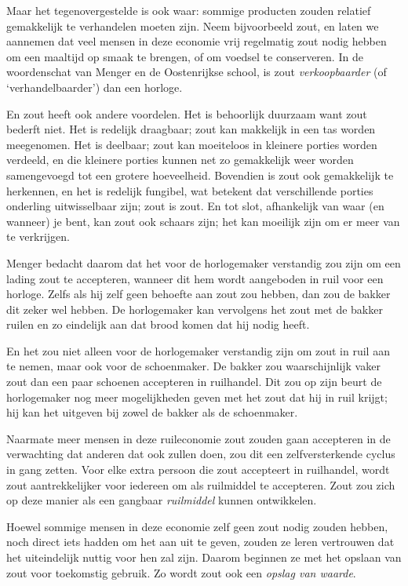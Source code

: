 \documentclass[
  a5paper,
  smalldemyvopaper,11pt,twoside,onecolumn,openright,extrafontsizes]{memoir}
\begin{document}
Maar het tegenovergestelde is ook waar: sommige producten zouden
relatief gemakkelijk te verhandelen moeten zijn. Neem bijvoorbeeld zout,
en laten we aannemen dat veel mensen in deze economie vrij regelmatig
zout nodig hebben om een maaltijd op smaak te brengen, of om voedsel te
conserveren. In de woordenschat van Menger en de Oostenrijkse school, is
zout \emph{verkoopbaarder} (of `verhandelbaarder') dan een horloge.

En zout heeft ook andere voordelen. Het is behoorlijk duurzaam want zout
bederft niet. Het is redelijk draagbaar; zout kan makkelijk in een tas
worden meegenomen. Het is deelbaar; zout kan moeiteloos in kleinere
porties worden verdeeld, en die kleinere porties kunnen net zo
gemakkelijk weer worden samengevoegd tot een grotere hoeveelheid.
Bovendien is zout ook gemakkelijk te herkennen, en het is redelijk
fungibel, wat betekent dat verschillende porties onderling uitwisselbaar
zijn; zout is zout. En tot slot, afhankelijk van waar (en wanneer) je
bent, kan zout ook schaars zijn; het kan moeilijk zijn om er meer van te
verkrijgen.

Menger bedacht daarom dat het voor de horlogemaker verstandig zou zijn
om een lading zout te accepteren, wanneer dit hem wordt aangeboden in
ruil voor een horloge. Zelfs als hij zelf geen behoefte aan zout zou
hebben, dan zou de bakker dit zeker wel hebben. De horlogemaker kan
vervolgens het zout met de bakker ruilen en zo eindelijk aan dat brood
komen dat hij nodig heeft.

En het zou niet alleen voor de horlogemaker verstandig zijn om zout in
ruil aan te nemen, maar ook voor de schoenmaker. De bakker zou
waarschijnlijk vaker zout dan een paar schoenen accepteren in
ruilhandel. Dit zou op zijn beurt de horlogemaker nog meer mogelijkheden
geven met het zout dat hij in ruil krijgt; hij kan het uitgeven bij
zowel de bakker als de schoenmaker.

Naarmate meer mensen in deze ruileconomie zout zouden gaan accepteren in
de verwachting dat anderen dat ook zullen doen, zou dit een
zelfversterkende cyclus in gang zetten. Voor elke extra persoon die zout
accepteert in ruilhandel, wordt zout aantrekkelijker voor iedereen om
als ruilmiddel te accepteren. Zout zou zich op deze manier als een
gangbaar \emph{ruilmiddel} kunnen ontwikkelen.

Hoewel sommige mensen in deze economie zelf geen zout nodig zouden
hebben, noch direct iets hadden om het aan uit te geven, zouden ze leren
vertrouwen dat het uiteindelijk nuttig voor hen zal zijn. Daarom
beginnen ze met het opslaan van zout voor toekomstig gebruik. Zo wordt
zout ook een \emph{opslag van waarde}.
\end{document}
